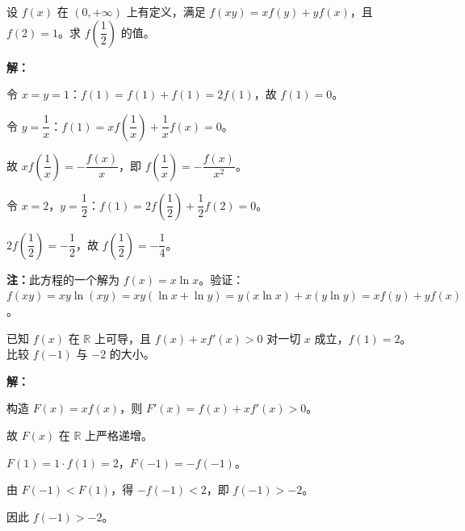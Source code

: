 \documentclass[12pt,a4paper]{ctexart}
\begin{document}
\begin{appbox}[应用题2]
设 $f(x)$ 在 $(0,+\infty)$ 上有定义，满足 $f(xy)=xf(y)+yf(x)$，且 $f(2)=1$。求 $f\!\left(\dfrac{1}{2}\right)$ 的值。

\medskip
\textbf{解：}

令 $x=y=1$：$f(1)=f(1)+f(1)=2f(1)$，故 $f(1)=0$。

令 $y=\dfrac{1}{x}$：$f(1)=xf\!\left(\dfrac{1}{x}\right)+\dfrac{1}{x}f(x)=0$。

故 $xf\!\left(\dfrac{1}{x}\right)=-\dfrac{f(x)}{x}$，即 $f\!\left(\dfrac{1}{x}\right)=-\dfrac{f(x)}{x^2}$。

令 $x=2$，$y=\dfrac{1}{2}$：$f(1)=2f\!\left(\dfrac{1}{2}\right)+\dfrac{1}{2}f(2)=0$。

$2f\!\left(\dfrac{1}{2}\right)=-\dfrac{1}{2}$，故 $\boxed{f\!\left(\dfrac{1}{2}\right)=-\dfrac{1}{4}}$。

\medskip
\textbf{注：}此方程的一个解为 $f(x)=x\ln x$。验证：$f(xy)=xy\ln(xy)=xy(\ln x+\ln y)=y(x\ln x)+x(y\ln y)=xf(y)+yf(x)$。\checkmark
\end{appbox}

\begin{appbox}[应用题3]
已知 $f(x)$ 在 $\mathbb{R}$ 上可导，且 $f(x)+xf'(x)>0$ 对一切 $x$ 成立，$f(1)=2$。比较 $f(-1)$ 与 $-2$ 的大小。

\medskip
\textbf{解：}

构造 $F(x)=xf(x)$，则 $F'(x)=f(x)+xf'(x)>0$。

故 $F(x)$ 在 $\mathbb{R}$ 上严格递增。

$F(1)=1\cdot f(1)=2$，$F(-1)=-f(-1)$。

由 $F(-1)<F(1)$，得 $-f(-1)<2$，即 $f(-1)>-2$。

因此 $\boxed{f(-1)>-2}$。
\end{appbox}
\end{document}

